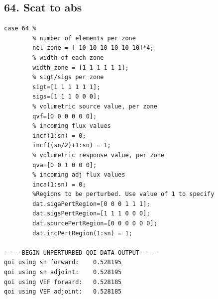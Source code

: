 \documentclass{article}
\begin{document}
\subsection{64. Scat to abs}
\begin{verbatim}
case 64 %
        % number of elements per zone
        nel_zone = [ 10 10 10 10 10 10]*4;
        % width of each zone
        width_zone = [1 1 1 1 1 1];
        % sigt/sigs per zone
        sigt=[1 1 1 1 1 1];
        sigs=[1 1 1 0 0 0];
        % volumetric source value, per zone
        qvf=[0 0 0 0 0 0];
        % incoming flux values
        incf(1:sn) = 0;
        incf((sn/2)+1:sn) = 1;
        % volumetric response value, per zone
        qva=[0 0 1 0 0 0];
        % incoming adj flux values
        inca(1:sn) = 0;
        %Regions to be perturbed. Use value of 1 to specify
        dat.sigaPertRegion=[0 0 0 1 1 1];
        dat.sigsPertRegion=[1 1 1 0 0 0];
        dat.sourcePertRegion=[0 0 0 0 0 0];
        dat.incPertRegion(1:sn) = 1; 
        
-----BEGIN UNPERTURBED QOI DATA OUTPUT----- 
qoi using sn forward: 	 0.528195 
qoi using sn adjoint: 	 0.528195 
qoi using VEF forward: 	 0.528185 
qoi using VEF adjoint: 	 0.528185 
\end{verbatim}
\end{document}
